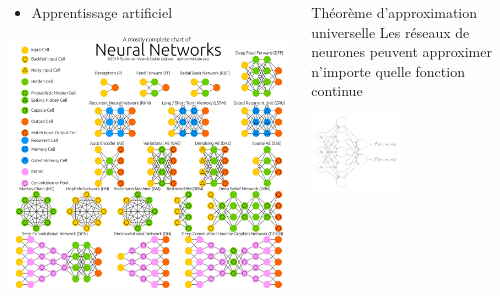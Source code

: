 \documentclass[aspectratio=169]{beamer}
\begin{document}
\begin{frame}
  \frametitle{\insertsection}

  \footnotesize
  \vspace{-0.5\baselineskip}
  \begin{columns}[t]
    \begin{column}{0.45\textwidth}
      \begin{itemize}
        \item Apprentissage artificiel
      \end{itemize}
      \vspace{-0.5\baselineskip}
      \begin{center}
        \includegraphics[width=\textwidth]{NeuralNetworkZo19High-lite}
      \end{center}
    \end{column}
    \begin{column}{0.65\textwidth}
      \begin{block}{Théorème d'approximation universelle}
        Les réseaux de neurones peuvent approximer n'importe quelle fonction continue
      \end{block}
      \vspace{-\baselineskip}
      \begin{center}
        \includegraphics[width=0.45\textwidth]{vector-valued-network}

\end{center}
\end{column}
\end{columns}
\end{frame}
\end{document}
